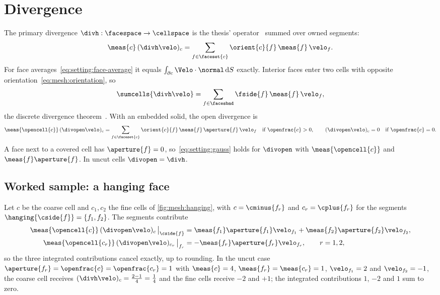 \section{Divergence}\label{sec:setting:divergence}
The primary divergence $\divh:\facespace\to\cellspace$ is the thesis'
operator~ summed over owned segments:
\begin{equation}\label{eq:setting:divergence}
  \meas{c}\,(\divh\velo)_c=\sum_{f\in\faceset{c}}\orient{c}{f}\,\meas{f}\,\velo_f .
\end{equation}
For face averages~\cref{eq:setting:face-average} it equals
$\integral{\partial c}{\Velo\cdot\normal}{S}$ exactly. Interior faces enter two
cells with opposite orientation~\cref{eq:mesh:orientation}, so
\begin{equation}\label{eq:setting:gauss}
  \sumcells{\divh\velo}=\sum_{f\in\facesbnd}\fside{f}\,\meas{f}\,\velo_f,
\end{equation}
the discrete divergence theorem~. With an embedded solid,
the open divergence is
\begin{equation}\label{eq:setting:open-divergence}
  \meas{\opencell{c}}\,(\divopen\velo)_c=\sum_{f\in\faceset{c}}\orient{c}{f}\,\meas{f}\,\aperture{f}\,\velo_f
  \quad\text{if }\openfrac{c}>0,\qquad (\divopen\velo)_c=0\quad\text{if }\openfrac{c}=0 .
\end{equation}
A face next to a covered cell has $\aperture{f}=0$, so~\cref{eq:setting:gauss}
holds for $\divopen$ with $\meas{\opencell{c}}$ and $\meas{f}\aperture{f}$. In
uncut cells $\divopen=\divh$.

\subsection{Worked sample: a hanging face}\label{sec:setting:sample}
Let $c$ be the coarse cell and $c_1,c_2$ the fine cells of
\cref{fig:mesh:hanging}, with $c=\cminus{f_r}$ and $c_r=\cplus{f_r}$ for the
segments $\hanging{\cside{f}}=\{f_1,f_2\}$. The segments contribute
\begin{align}
  \meas{\opencell{c}}\,(\divopen\velo)_c\,\big|_{\cside{f}}
    &=\meas{f_1}\aperture{f_1}\velo_{f_1}+\meas{f_2}\aperture{f_2}\velo_{f_2},
    \label{eq:setting:sample-coarse}\\
  \meas{\opencell{c_r}}\,(\divopen\velo)_{c_r}\,\big|_{f_r}
    &=-\meas{f_r}\aperture{f_r}\velo_{f_r},\qquad r=1,2,
    \label{eq:setting:sample-fine}
\end{align}
so the three integrated contributions cancel exactly, up to rounding. In the
uncut case $\aperture{f_r}=\openfrac{c}=\openfrac{c_r}=1$ with $\meas{c}=4$,
$\meas{f_r}=\meas{c_r}=1$, $\velo_{f_1}=2$ and $\velo_{f_2}=-1$, the coarse
cell receives $(\divh\velo)_c=\frac{2-1}{4}=\frac14$ and the fine cells receive
$-2$ and $+1$; the integrated contributions $1$, $-2$ and $1$ sum to zero.

